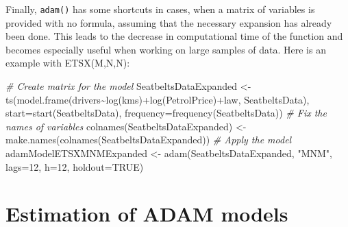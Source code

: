 \documentclass[
]{book}
\newenvironment{Shaded}{\begin{snugshade}}{\end{snugshade}}
\newcommand{\AttributeTok}[1]{\textcolor[rgb]{0.77,0.63,0.00}{#1}}
\newcommand{\CommentTok}[1]{\textcolor[rgb]{0.56,0.35,0.01}{\textit{#1}}}
\newcommand{\ConstantTok}[1]{\textcolor[rgb]{0.00,0.00,0.00}{#1}}
\newcommand{\DecValTok}[1]{\textcolor[rgb]{0.00,0.00,0.81}{#1}}
\newcommand{\FunctionTok}[1]{\textcolor[rgb]{0.00,0.00,0.00}{#1}}
\newcommand{\NormalTok}[1]{#1}
\newcommand{\OtherTok}[1]{\textcolor[rgb]{0.56,0.35,0.01}{#1}}
\newcommand{\SpecialCharTok}[1]{\textcolor[rgb]{0.00,0.00,0.00}{#1}}
\newcommand{\StringTok}[1]{\textcolor[rgb]{0.31,0.60,0.02}{#1}}
\theoremstyle{definition}
\theoremstyle{definition}
\theoremstyle{definition}
\theoremstyle{definition}
\theoremstyle{remark}
\begin{document}
Finally, \texttt{adam()} has some shortcuts in cases, when a matrix of variables is provided with no formula, assuming that the necessary expansion has already been done. This leads to the decrease in computational time of the function and becomes especially useful when working on large samples of data. Here is an example with ETSX(M,N,N):

\begin{Shaded}
\begin{Highlighting}[]
\CommentTok{\# Create matrix for the model}
\NormalTok{SeatbeltsDataExpanded }\OtherTok{\textless{}{-}}
  \FunctionTok{ts}\NormalTok{(}\FunctionTok{model.frame}\NormalTok{(drivers}\SpecialCharTok{\textasciitilde{}}\FunctionTok{log}\NormalTok{(kms)}\SpecialCharTok{+}\FunctionTok{log}\NormalTok{(PetrolPrice)}\SpecialCharTok{+}\NormalTok{law,}
\NormalTok{              SeatbeltsData),}
  \AttributeTok{start=}\FunctionTok{start}\NormalTok{(SeatbeltsData), }\AttributeTok{frequency=}\FunctionTok{frequency}\NormalTok{(SeatbeltsData))}
\CommentTok{\# Fix the names of variables}
\FunctionTok{colnames}\NormalTok{(SeatbeltsDataExpanded) }\OtherTok{\textless{}{-}}
  \FunctionTok{make.names}\NormalTok{(}\FunctionTok{colnames}\NormalTok{(SeatbeltsDataExpanded))}
\CommentTok{\# Apply the model}
\NormalTok{adamModelETSXMNMExpanded }\OtherTok{\textless{}{-}} \FunctionTok{adam}\NormalTok{(SeatbeltsDataExpanded, }\StringTok{"MNM"}\NormalTok{,}
                                 \AttributeTok{lags=}\DecValTok{12}\NormalTok{, }\AttributeTok{h=}\DecValTok{12}\NormalTok{, }\AttributeTok{holdout=}\ConstantTok{TRUE}\NormalTok{)}
\end{Highlighting}
\end{Shaded}

\hypertarget{ADAMETSEstimation}{%
\chapter{Estimation of ADAM models}\label{ADAMETSEstimation}}
\end{document}
